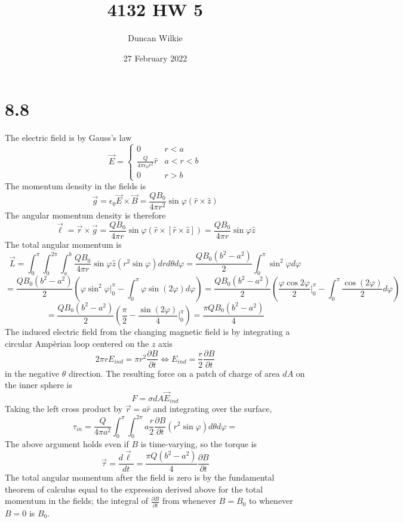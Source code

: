 \documentclass{article}
\title{4132 HW 5}
\author{Duncan Wilkie}
\date{27 February 2022}
\begin{document}
\maketitle

\section*{8.8}
The electric field is by Gauss's law
\[\vec{E}=
  \begin{cases}
    0 & r < a\\
    \frac{Q}{4\pi\epsilon_0r^2}\hat{r} & a < r < b\\
    0 & r > b
  \end{cases}
\]
The momentum density in the fields is
\[\vec{g}=\epsilon_0\vec{E}\times\vec{B}=\frac{QB_0}{4\pi r^2}\sin\varphi(\hat{r}\times\hat{z})\]
The angular momentum density is therefore
\[\vec{\ell}=\vec{r}\times\vec{g}=\frac{QB_0}{4\pi r}\sin\varphi(\hat{r}\times[\hat{r}\times\hat{z}])=\frac{QB_0}{4\pi r}\sin\varphi\hat{z}\]
The total angular momentum is
\[\vec{L}=\int_0^\pi\int_0^{2\pi}\int_a^b\frac{QB_0}{4\pi r}\sin\varphi\hat{z}(r^2\sin\varphi)drd\theta d\varphi=\frac{QB_0(b^2-a^2)}{2}\int_0^{\pi}\sin^2\varphi d\varphi\]
\[=\frac{QB_0(b^2-a^2)}{2}\left( {\varphi}\sin^2\varphi\bigg|_0^\pi-\int_0^\pi \varphi\sin(2\varphi)d\varphi \right)=\frac{QB_0(b^2-a^2)}{2}\left( \frac{\varphi\cos{2\varphi}}{2}\bigg|_0^\pi -\int_0^\pi\frac{\cos(2\varphi)}{2}d\varphi\right)\]
\[=\frac{QB_0(b^2-a^2)}{2}\left( \frac{\pi}{2}-\frac{\sin(2\varphi)}{4}\bigg|_0^\pi \right)=\frac{\pi QB_0(b^2-a^2)}{4}\]
The induced electric field from the changing magnetic field is by integrating a circular Amp\`erian loop centered on the $z$ axis
\[2\pi rE_{ind}=\pi r^2\frac{\partial B}{\partial t}\Leftrightarrow E_{ind}=\frac{r}{2}\frac{\partial B}{\partial t}\]
in the negative $\theta$ direction.
The resulting force on a patch of charge of area $dA$ on the inner sphere is
\[F=\sigma dA\vec{E}_{ind}\]
Taking the left cross product by $\vec{r}=a\hat{r}$ and integrating over the surface,
\[\tau_{in}=\frac{Q}{4\pi a^2}\int_0^\pi\int_0^{2\pi}a\frac{r}{2}\frac{\partial B}{\partial t}(r^2\sin\varphi)d\theta d\varphi=\]
The above argument holds even if $B$ is time-varying, so the torque is
\[\vec{\tau}=\frac{d\vec{\ell}}{dt}=\frac{\pi Q(b^2-a^2)}{4}\frac{\partial B}{\partial t}\]
The total angular momentum after the field is zero is by the fundamental theorem of calculus equal to the expression derived above for the total momentum in the fields; the integral of $\frac{\partial B}{\partial t}$ from whenever $B=B_0$ to whenever $B=0$ is $B_0$.
\end{document}
